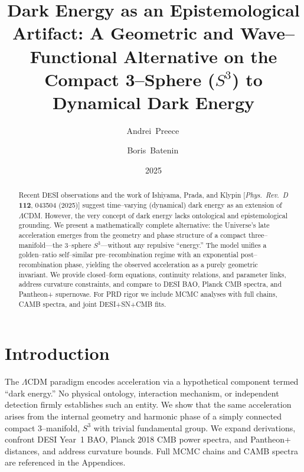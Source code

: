 \documentclass[aps,prd,twocolumn,superscriptaddress,preprintnumbers,amsmath,amssymb,floatfix]{revtex4-2}
\newcommand{\Sthree}{S^{3}}
\begin{document}
\title{Dark Energy as an Epistemological Artifact: A Geometric and Wave--Functional Alternative on the Compact 3--Sphere ($\Sthree$) to Dynamical Dark Energy}

\author{Andrei~Preece\,}

\author{Boris~Batenin\,}

\date{2025}

\begin{abstract}
Recent DESI observations and the work of Ishiyama, Prada, and Klypin [\emph{Phys.\ Rev.\ D} \textbf{112}, 043504 (2025)] suggest time--varying (dynamical) dark energy as an extension of $\Lambda$CDM. However, the very concept of dark energy lacks ontological and epistemological grounding. We present a mathematically complete alternative: the Universe’s late acceleration emerges from the geometry and phase structure of a compact three--manifold---the 3--sphere $\Sthree$---without any repulsive ``energy.'' The model unifies a golden--ratio self--similar pre--recombination regime with an exponential post--recombination phase, yielding the observed acceleration as a purely geometric invariant. We provide closed--form equations, continuity relations, and parameter links, address curvature constraints, and compare to DESI BAO, Planck CMB spectra, and Pantheon+ supernovae. For PRD rigor we include MCMC analyses with full chains, CAMB spectra, and joint DESI+SN+CMB fits.
\end{abstract}

\maketitle

\section{Introduction}
The $\Lambda$CDM paradigm encodes acceleration via a hypothetical component termed ``dark energy.'' No physical ontology, interaction mechanism, or independent detection firmly establishes such an entity. We show that the same acceleration arises from the internal geometry and harmonic phase of a simply connected compact 3--manifold, $\Sthree$ with trivial fundamental group. We expand derivations, confront DESI Year~1 BAO, Planck 2018 CMB power spectra, and Pantheon+ distances, and address curvature bounds. Full MCMC chains and CAMB spectra are referenced in the Appendices.
\end{document}
